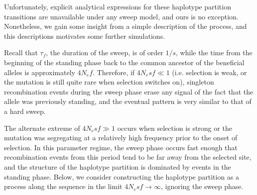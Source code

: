\documentclass[a4paper,10pt]{article}
\begin{document}
Unfortunately, explicit analytical expressions for these haplotype partition transitions are unavailable under any sweep model, and ours is no exception. Nonetheless, we gain some insight from a simple description of the process, and this descriptions motivates some further simulations.

Recall that $\tau_{f}$, the duration of the sweep, is of order $1/s$, while the time from the beginning of the standing phase back to the common ancestor of the beneficial alleles is approximately $4N_e f$. Therefore, if $4N_e s f \ll 1$ (i.e. selection is weak, or the mutation is still quite rare when selection switches on), singleton recombination events during the sweep phase erase any signal of the fact that the allele was previously standing, and the eventual pattern is very similar to that of a hard sweep.

The alternate extreme of $4N_e s f \gg 1$ occurs when selection is strong or the mutation was segregating at a relatively high frequency prior to the onset of selection. In this parameter regime, the sweep phase occurs fast enough that recombination events from this period tend to be far away from the selected site, and the structure of the haplotype partition is dominated by events in the standing phase. Below, we consider constructing the haplotype partition as a process along the sequence in the limit $4N_e s f \rightarrow \infty$, ignoring the sweep phase. 
\end{document}
